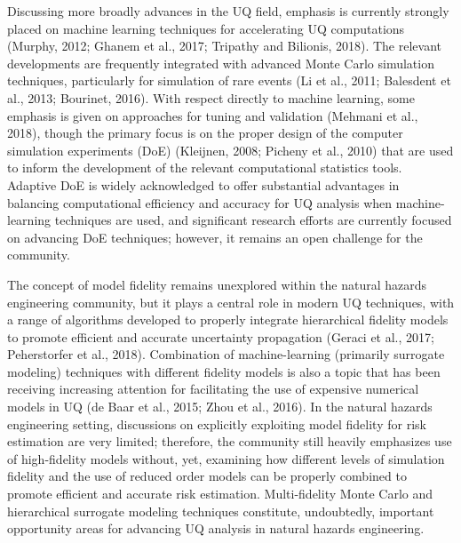 Discussing more broadly advances in the UQ field, emphasis is currently strongly placed on machine learning techniques for accelerating UQ computations (Murphy, 2012; Ghanem et al., 2017; Tripathy and Bilionis, 2018). The relevant developments are frequently integrated with advanced Monte Carlo simulation techniques, particularly for simulation of rare events (Li et al., 2011; Balesdent et al., 2013; Bourinet, 2016). With respect directly to machine learning, some emphasis is given on approaches for tuning and validation (Mehmani et al., 2018), though the primary focus is on the proper design of the computer simulation experiments (DoE) (Kleijnen, 2008; Picheny et al., 2010) that are used to inform the development of the relevant computational statistics tools. Adaptive DoE is widely acknowledged to offer substantial advantages in balancing computational efficiency and accuracy for UQ analysis when machine-learning techniques are used, and significant research efforts are currently focused on advancing DoE techniques; however, it remains an open challenge for the community. 

The concept of model fidelity remains unexplored within the natural hazards engineering community, but it plays a central role in modern UQ techniques, with a range of algorithms developed to properly integrate hierarchical fidelity models to promote efficient and accurate uncertainty propagation (Geraci et al., 2017; Peherstorfer et al., 2018). Combination of machine-learning (primarily surrogate modeling) techniques with different fidelity models is also a topic that has been receiving increasing attention for facilitating the use of expensive numerical models in UQ (de Baar et al., 2015; Zhou et al., 2016). In the natural hazards engineering setting, discussions on explicitly exploiting model fidelity for risk estimation are very limited; therefore, the community still heavily emphasizes use of high-fidelity models without, yet, examining how different levels of simulation fidelity and the use of reduced order models can be properly combined to promote efficient and accurate risk estimation. Multi-fidelity Monte Carlo and hierarchical surrogate modeling techniques constitute, undoubtedly, important opportunity areas for advancing UQ analysis in natural hazards engineering.

